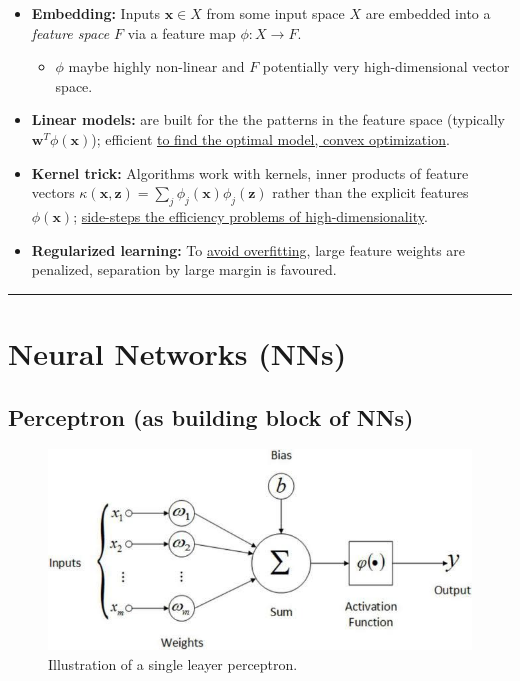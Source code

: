 \documentclass[12pt, a4paper]{article}
\let\stdsection\section
\renewcommand\section{\newpage\stdsection} %
\begin{document}
\begin{itemize}
  \item \textbf{Embedding:} Inputs $\mathbf{x} \in X$ from some input space $X$ are embedded into a \textit{feature space} $F$ via a feature map $\phi: X \to F$.
  \begin{itemize}
    \item $\phi$ maybe highly non-linear and $F$ potentially very high-dimensional vector space.
  \end{itemize}
  \item \textbf{Linear models:} are built for the the patterns in the feature space (typically $\mathbf{w}^T \phi(\mathbf{x})$); efficient \uline{to find the optimal model, convex optimization}.
  \item \textbf{Kernel trick:} Algorithms work with kernels, inner products of feature vectors $\kappa(\mathbf{x}, \mathbf{z}) = \sum_j \phi_j(\mathbf{x}) \phi_j(\mathbf{z})$ rather than the explicit features $\phi(\mathbf{x})$; \uline{side-steps the efficiency problems of high-dimensionality}.
  \item \textbf{Regularized learning:} To \uline{avoid overfitting}, large feature weights are penalized, separation by large margin is favoured.
\end{itemize}







\begin{center}\rule{3in}{0.4pt}\end{center}




















\section{Neural Networks (NNs)}\label{Neural-networks}


\subsection{Perceptron (as building block of NNs)}\label{Perceptron-as-building-block-of-NNs}


\begin{figure}[H]
  \centering
    \includegraphics[width=0.6\columnwidth]{images/perceptron.jpeg}
    \caption{Illustration of a single leayer perceptron.}
    \label{fig:perceptron}
\end{figure}
\end{document}
